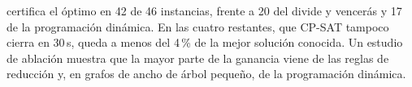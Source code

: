 \hyvc{} certifica el óptimo en 42 de 46 instancias, frente a 20 del divide y vencerás y 17 de la programación dinámica. En las cuatro restantes, que CP-SAT tampoco cierra en 30\,s, queda a menos del 4\,\% de la mejor solución conocida. Un estudio de ablación muestra que la mayor parte de la ganancia viene de las reglas de reducción y, en grafos de ancho de árbol pequeño, de la programación dinámica.
